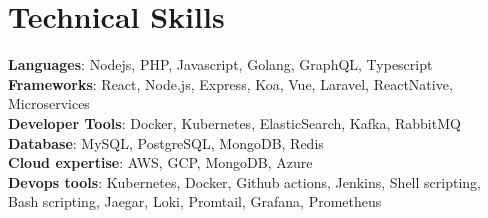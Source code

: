 \documentclass[letterpaper,11pt]{article}
\begin{document}
%
\section{Technical Skills}
 \begin{itemize}[leftmargin=0.15in, label={}]
    \small{\item{
     \textbf{Languages}{: Nodejs, PHP, Javascript, Golang, GraphQL, Typescript} \\
     \textbf{Frameworks}{: React, Node.js, Express, Koa, Vue, Laravel, ReactNative, Microservices} \\
     \textbf{Developer Tools}{: Docker, Kubernetes, ElasticSearch, Kafka, RabbitMQ} \\
     \textbf{Database}{: MySQL, PostgreSQL, MongoDB, Redis} \\
     \textbf{Cloud expertise}{: AWS, GCP, MongoDB, Azure} \\
     \textbf{Devops tools}{: Kubernetes, Docker, Github actions, Jenkins, Shell scripting, Bash scripting, Jaegar, Loki, Promtail, Grafana, Prometheus}
    }}
 \end{itemize}


\end{document}
